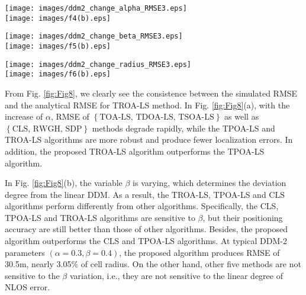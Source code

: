 \documentclass[journal]{IEEEtran}
\begin{document}
\begin{figure*}[htb!]
   \centering
   \begin{minipage}[b]{0.3\linewidth}
      \centering
      \texttt{[image: images/ddm2\_change\_alpha\_RMSE3.eps]}\\
      \texttt{[image: images/f4(b).eps]}
      \caption*{(a)\quad RMSE versus ${\alpha}$:\\ ${\beta =0.2}$}
      \label{Fig8:(a)}
   \end{minipage}
      \qquad
      \begin{minipage}[b]{0.3\linewidth}
         \centering
         \texttt{[image: images/ddm2\_change\_beta\_RMSE3.eps]}\\
         \texttt{[image: images/f5(b).eps]}
         \caption*{(b)\quad RMSE versus ${\beta}$: \\${\alpha =0.3}$}
         \label{Fig8:(b)}
      \end{minipage}
         \qquad
         \begin{minipage}[b]{0.3\linewidth}
            \centering
            \texttt{[image: images/ddm2\_change\_radius\_RMSE3.eps]}\\
            \texttt{[image: images/f6(b).eps]}
            \caption*{(c)\quad RMSE versus cell radius:\\ $\alpha$ = 0.3, $\beta$ = 0.2}
            \label{Fig8:(c)}
         \end{minipage}

         \caption{The performance comparison for the NLOS DDM-2.}
         \label{fig:Fig8}
\end{figure*}

From Fig. \ref{fig:Fig8}, we clearly see the consistence between the simulated RMSE and the analytical RMSE for TROA-LS method. In Fig. \ref{fig:Fig8}(a), with the increase of ${\alpha}$, RMSE of $\left\{\text{TOA-LS, TDOA-LS, TSOA-LS}\right\}$ as well as $\left\{\text{CLS, RWGH, SDP}\right\}$ methods degrade rapidly, while the TPOA-LS and TROA-LS algorithms are more robust and produce fewer localization errors. In addition, the proposed TROA-LS algorithm outperforms the TPOA-LS algorithm.

In Fig. \ref{fig:Fig8}(b), the variable $\beta$ is varying, which determines the deviation degree from the linear DDM. As a result, the TROA-LS, TPOA-LS and CLS algorithms perform differently from other algorithms. Specifically, the CLS, TPOA-LS and TROA-LS algorithms are sensitive to $\beta$, but their positioning accuracy are still better than those of other algorithms. Besides, the proposed algorithm outperforms the CLS and TPOA-LS algorithms. At typical DDM-2 parameters $\left({\alpha} = 0.3, {\beta} = 0.4\right)$, the proposed algorithm produces RMSE of 30.5m, nearly 3.05\% of cell radius. On the other hand, other five methods are not sensitive to the $\beta$ variation, i.e., they are not sensitive to the linear degree of NLOS error.
\end{document}

